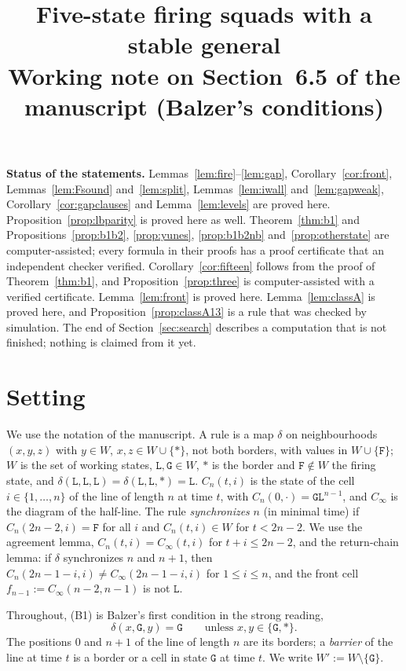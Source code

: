\documentclass[11pt]{article}
\title{Five-state firing squads with a stable general\\[2pt]\large Working note on Section~6.5 of the manuscript (Balzer's conditions)}
\author{}
\date{}
\theoremstyle{remark}
\newcommand{\Lq}{\mathtt{L}}\newcommand{\Gq}{\mathtt{G}}\newcommand{\Aq}{\mathtt{A}}\newcommand{\Bq}{\mathtt{B}}\newcommand{\Fq}{\mathtt{F}}
\begin{document}
\maketitle

\noindent\textbf{Status of the statements.}
Lemmas~\ref{lem:fire}--\ref{lem:gap}, Corollary~\ref{cor:front}, Lemmas~\ref{lem:Fsound} and~\ref{lem:split},
Lemmas~\ref{lem:iwall} and~\ref{lem:gapweak}, Corollary~\ref{cor:gapclauses} and Lemma~\ref{lem:levels} are
proved here. Proposition~\ref{prop:lbparity} is proved here as well.
Theorem~\ref{thm:b1} and Propositions~\ref{prop:b1b2}, \ref{prop:yunes}, \ref{prop:b1b2nb}
and~\ref{prop:otherstate} are computer-assisted; every formula in their proofs has a proof certificate that an independent checker verified.
Corollary~\ref{cor:fifteen} follows from the proof of Theorem~\ref{thm:b1}, and Proposition~\ref{prop:three}
is computer-assisted with a verified certificate. Lemma~\ref{lem:front} is proved here. Lemma~\ref{lem:classA} is proved here, and
Proposition~\ref{prop:classA13} is a rule that was checked by simulation. The end of
Section~\ref{sec:search} describes a computation that is not finished; nothing is claimed from it yet.

\section{Setting}

We use the notation of the manuscript. A rule is a map $\delta$ on neighbourhoods $(x,y,z)$ with $y\in W$,
$x,z\in W\cup\{\ast\}$, not both borders, with values in $W\cup\{\Fq\}$; $W$ is the set of working states,
$\Lq,\Gq\in W$, $\ast$ is the border and $\Fq\notin W$ the firing state, and
$\delta(\Lq,\Lq,\Lq)=\delta(\Lq,\Lq,\ast)=\Lq$. $C_n(t,i)$ is the state of the cell $i\in\{1,\dots,n\}$ of the
line of length $n$ at time $t$, with $C_n(0,\cdot)=\Gq\Lq^{n-1}$, and $C_\infty$ is the diagram of the
half-line. The rule \emph{synchronizes} $n$ (in minimal time) if $C_n(2n-2,i)=\Fq$ for all $i$ and
$C_n(t,i)\in W$ for $t<2n-2$. We use the agreement lemma, $C_n(t,i)=C_\infty(t,i)$ for $t+i\le2n-2$, and the
return-chain lemma: if $\delta$ synchronizes $n$ and $n+1$, then $C_n(2n-1-i,i)\ne C_\infty(2n-1-i,i)$ for
$1\le i\le n$, and the front cell $f_{n-1}:=C_\infty(n-2,n-1)$ is not $\Lq$.

Throughout, (B1) is Balzer's first condition in the strong reading,
\begin{equation}\label{eq:B1}
\delta(x,\Gq,y)=\Gq\qquad\text{unless }x,y\in\{\Gq,\ast\}. \tag{B1}
\end{equation}
The positions $0$ and $n+1$ of the line of length $n$ are its borders; a \emph{barrier} of the line at time $t$
is a border or a cell in state $\Gq$ at time $t$. We write $W':=W\setminus\{\Gq\}$.
\end{document}
